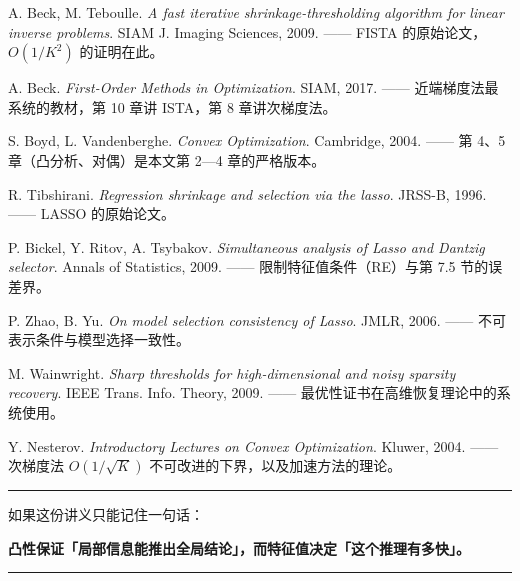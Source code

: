 \documentclass[11pt,a4paper,UTF8]{ctexart}
\theoremstyle{plain}
\theoremstyle{definition}
\theoremstyle{remark}
\begin{document}
\begin{enumerate}[label={[\arabic*]}]
\item A. Beck, M. Teboulle. \emph{A fast iterative shrinkage-thresholding algorithm for linear
      inverse problems}. SIAM J. Imaging Sciences, 2009.
      —— FISTA 的原始论文，$O(1/K^2)$ 的证明在此。
\item A. Beck. \emph{First-Order Methods in Optimization}. SIAM, 2017.
      —— 近端梯度法最系统的教材，第 10 章讲 ISTA，第 8 章讲次梯度法。
\item S. Boyd, L. Vandenberghe. \emph{Convex Optimization}. Cambridge, 2004.
      —— 第 4、5 章（凸分析、对偶）是本文第 2—4 章的严格版本。
\item R. Tibshirani. \emph{Regression shrinkage and selection via the lasso}. JRSS-B, 1996.
      —— LASSO 的原始论文。
\item P. Bickel, Y. Ritov, A. Tsybakov. \emph{Simultaneous analysis of Lasso and Dantzig
      selector}. Annals of Statistics, 2009.
      —— 限制特征值条件（RE）与第 7.5 节的误差界。
\item P. Zhao, B. Yu. \emph{On model selection consistency of Lasso}. JMLR, 2006.
      —— 不可表示条件与模型选择一致性。
\item M. Wainwright. \emph{Sharp thresholds for high-dimensional and noisy sparsity recovery}.
      IEEE Trans. Info. Theory, 2009.
      —— 最优性证书在高维恢复理论中的系统使用。
\item Y. Nesterov. \emph{Introductory Lectures on Convex Optimization}. Kluwer, 2004.
      —— 次梯度法 $O(1/\sqrt K)$ 不可改进的下界，以及加速方法的理论。
\end{enumerate}

\vspace{2em}
\begin{center}
\rule{0.4\linewidth}{0.4pt}

\small 如果这份讲义只能记住一句话：

\medskip
\textbf{凸性保证「局部信息能推出全局结论」，而特征值决定「这个推理有多快」。}

\medskip
\rule{0.4\linewidth}{0.4pt}
\end{center}
\end{document}
